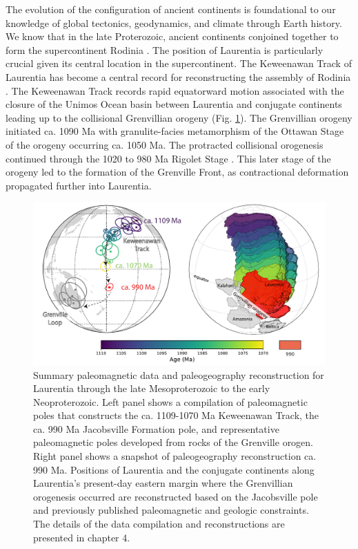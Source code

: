The evolution of the configuration of ancient continents is foundational to our knowledge of global tectonics, geodynamics, and climate through Earth history. We know that in the late Proterozoic, ancient continents conjoined together to form the supercontinent Rodinia \citep{Swanson-Hysell2021c}. The position of Laurentia is particularly crucial given its central location in the supercontinent. The Keweenawan Track of Laurentia has become a central record for reconstructing the assembly of Rodinia \citep{Evans2021b}. The Keweenawan Track records rapid equatorward motion associated with the closure of the Unimos Ocean basin between Laurentia and conjugate continents leading up to the collisional Grenvillian orogeny (Fig. \ref{fig:abstract_paleogeography}). The Grenvillian orogeny initiated ca. 1090 Ma with granulite-facies metamorphism of the Ottawan Stage of the orogeny occurring ca. 1050 Ma. The protracted collisional orogenesis continued through the 1020 to 980 Ma Rigolet Stage \citep{Rivers2008a, Rivers2012b, Swanson-Hysell2023a}. This later stage of the orogeny led to the formation of the Grenville Front, as contractional deformation propagated further into Laurentia. 

\begin{figure}[h!]
    \centering
    \includegraphics[width=\textwidth]{figure/pole_summary.pdf}
    \caption[Summary paleomagnetic poles and associated paleogeography reconstruction for Laurentia and some of its conjugate continents through the late Mesoproterozoic to the early Neoproterozoic.]{Summary paleomagnetic data and paleogeography reconstruction for Laurentia through the late Mesoproterozoic to the early Neoproterozoic. Left panel shows a compilation of paleomagnetic poles that constructs the ca. 1109-1070 Ma Keweenawan Track, the ca. 990 Ma Jacobsville Formation pole, and representative paleomagnetic poles developed from rocks of the Grenville orogen. Right panel shows a snapshot of paleogeography reconstruction ca. 990 Ma. Positions of Laurentia and the conjugate continents along Laurentia's present-day eastern margin where the Grenvillian orogenesis occurred are reconstructed based on the Jacobsville pole and previously published paleomagnetic and geologic constraints. The details of the data compilation and reconstructions are presented in chapter 4.}
    \label{fig:abstract_paleogeography}
\end{figure}

